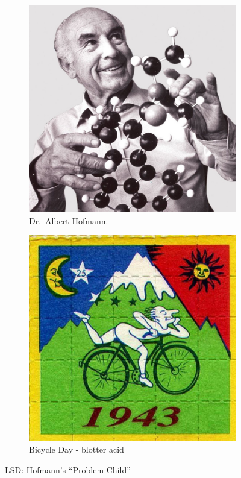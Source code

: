 \documentclass{UIdahoMastersThesis}
\begin{document}
\begin{figure}%
  \centering
  \begin{subfigure}[b]{0.4\linewidth}
    \includegraphics[width=\linewidth]{hofmann_sq.jpg}
    \caption{Dr.~Albert Hofmann.}
  \end{subfigure}
  \begin{subfigure}[b]{0.4\linewidth}
    \includegraphics[width=\linewidth]{bicycle_day.jpg}
    \caption{Bicycle Day - blotter acid}
  \end{subfigure}
  \caption{LSD: Hofmann's \enquote{Problem Child}}
  \label{fig:hofmann}
\end{figure}
\end{document}
